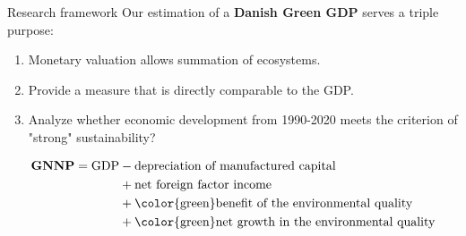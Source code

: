 \begin{frame}{Research framework}
  Our estimation of a \textbf{Danish Green GDP} serves a triple purpose:
  \pause
  \begin{enumerate}
    \item Monetary valuation allows summation of ecosystems.
    \pause
    \item Provide a measure that is directly comparable to the GDP.
    \pause
    \item Analyze whether economic development from 1990-2020 meets the criterion of "strong" sustainability?
  \end{enumerate}
  \pause
  \begin{tcolorbox}
    \begin{align*}
        \textbf{GNNP} = \text{GDP} &- \text{depreciation of manufactured capital} \\
        &+ \text{net foreign factor income} \\
        &+ \text{\color{green}benefit of the environmental quality} \\
        &+ \text{\color{green}net growth in the environmental quality}
    \end{align*}
  \end{tcolorbox}
  \vfill


\end{frame}
